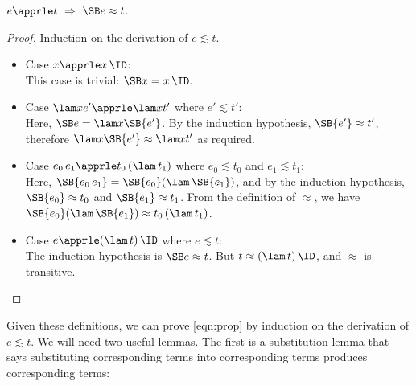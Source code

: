 \begin{lemma}
$e \apprle t\ \Rightarrow\ \SB e \approx t$.
\label{lem:equiv}
\end{lemma}
\begin{proof}
Induction on the derivation of $e \apprle t$.

\begin{itemize}
\item Case $x \apprle x\,\ID$:\\
This case is trivial: $\SB x = x\,\ID$.

\item Case $\lam x {e'} \apprle \lam x{t'}$ where $e' \apprle t'$:\\
Here, $\SB e = \lam x {\SB{e'} }$.
By the induction hypothesis, $\SB{e'}\approx t'$, therefore
$\lam x{\SB{e'} } \approx \lam x{t'}$ as required.

\item Case $e_0\,e_1 \apprle t_0\,(\lam\,{t_1})$ where $e_0\apprle t_0$ and $e_1\apprle t_1$:\\
Here, $\SB{e_0\,e_1} = \SB{e_0} (\lam\,\SB{e_1})$, and by the induction hypothesis,
$\SB{e_0} \approx t_0$ and $\SB{e_1} \approx t_1$.
From the definition of $\approx$, we have
$\SB{e_0} (\lam\,\SB{e_1}) \approx t_0\,(\lam\,{t_1})$.

\item Case $e \apprle (\lam\,t)\,\ID$ where $e\apprle t$:\\
The induction hypothesis is $\SB e \approx t$. But $t \approx (\lam\,t)\,\ID$, and
$\approx$ is transitive.
\end{itemize}
\end{proof}

Given these definitions, we can prove \eqref{eqn:prop} by induction on
the derivation of $e\apprle t$. We will need two useful lemmas. The first is
a substitution lemma that says substituting corresponding terms into
corresponding terms produces corresponding terms:

